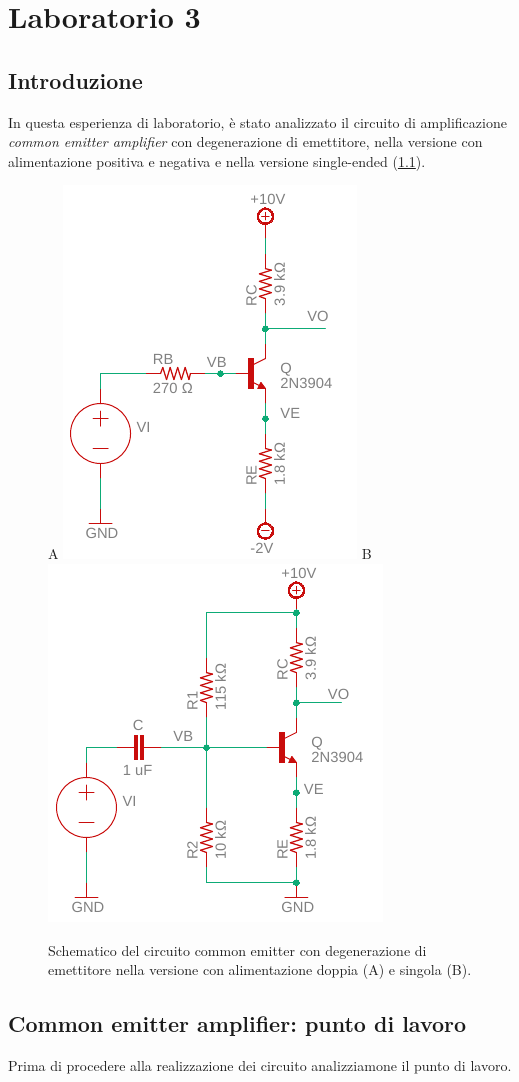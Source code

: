 \chapter{Laboratorio 3}
\section{Introduzione}
In questa esperienza di laboratorio, è stato analizzato il circuito di amplificazione \textit{common emitter amplifier} con degenerazione di emettitore, nella versione con alimentazione positiva e negativa e nella versione single-ended (\Fig\ref{fig:commonemitter}).
\begin{figure}[h!]
	\centering
	A
	\includegraphics[width=0.4\linewidth]{./OtherFiles/Laboratorio 3/common emitter}
	B
	\includegraphics[width=0.4\linewidth]{./OtherFiles/Laboratorio 3/common emitter_se}
	\caption{Schematico del circuito common emitter con degenerazione di emettitore nella versione con alimentazione doppia (A) e singola (B).}
	\label{fig:commonemitter}
\end{figure}


\section{Common emitter amplifier: punto di lavoro}
Prima di procedere alla realizzazione dei circuito analizziamone il punto di lavoro.

